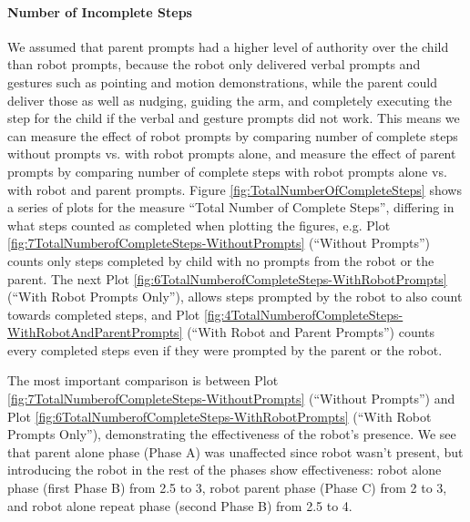 \paragraph{Number of Incomplete Steps}
We assumed that parent prompts had a higher level of authority over the child than robot prompts, because the robot only delivered verbal prompts and gestures such as pointing and motion demonstrations, while the parent could deliver those as well as nudging, guiding the arm, and completely executing the step for the child if the verbal and gesture prompts did not work.  This means we can measure the effect of robot prompts by comparing number of complete steps without prompts vs. with robot prompts alone, and measure the effect of parent prompts by comparing number of complete steps with robot prompts alone vs. with robot and parent prompts.  Figure \ref{fig:TotalNumberOfCompleteSteps} shows a series of plots for the measure ``Total Number of Complete Steps'', differing in what steps counted as completed when plotting the figures, e.g. Plot \ref{fig:7TotalNumberofCompleteSteps-WithoutPrompts} (``Without Prompts'') counts only steps completed by child with no prompts from the robot or the parent.  The next Plot \ref{fig:6TotalNumberofCompleteSteps-WithRobotPrompts} (``With Robot Prompts Only''), allows steps prompted by the robot to also count towards completed steps, and Plot \ref{fig:4TotalNumberofCompleteSteps-WithRobotAndParentPrompts} (``With Robot and Parent Prompts'') counts every completed steps even if they were prompted by the parent or the robot.

The most important comparison is between Plot \ref{fig:7TotalNumberofCompleteSteps-WithoutPrompts} (``Without Prompts'') and Plot \ref{fig:6TotalNumberofCompleteSteps-WithRobotPrompts} (``With Robot Prompts Only''), demonstrating the effectiveness of the robot's presence.  We see that parent alone phase (Phase A) was unaffected since robot wasn't present, but introducing the robot in the rest of the phases show effectiveness: robot alone phase (first Phase B) from 2.5 to 3, robot parent phase (Phase C) from 2 to 3, and robot alone repeat phase (second Phase B) from 2.5 to 4.

